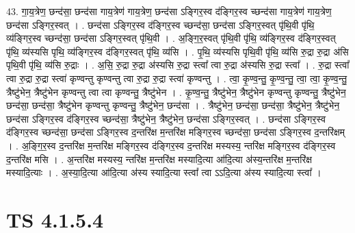 \documentclass[17pt]{extarticle}
\begin{document}
43. गा॒य॒त्रेण॒ छन्द॑सा॒ छन्द॑सा गाय॒त्रेण॑ गाय॒त्रेण॒ छन्द॑सा ऽङ्गिर॒स्व द॑ङ्गिर॒स्व च्छन्द॑सा गाय॒त्रेण॑ गाय॒त्रेण॒ छन्द॑सा ऽङ्गिर॒स्वत् । . छन्द॑सा ऽङ्गिर॒स्व द॑ङ्गिर॒स्व च्छन्द॑सा॒ छन्द॑सा ऽङ्गिर॒स्वत् पृ॑थि॒वी पृ॑थि॒ व्य॑ङ्गिर॒स्व च्छन्द॑सा॒ छन्द॑सा ऽङ्गिर॒स्वत् पृ॑थि॒वी । . अ॒ङ्गि॒र॒स्वत् पृ॑थि॒वी पृ॑थि॒ व्य॑ङ्गिर॒स्व द॑ङ्गिर॒स्वत् पृ॑थि॒ व्य॑स्यसि पृथि॒ व्य॑ङ्गिर॒स्व द॑ङ्गिर॒स्वत् पृ॑थि॒ व्य॑सि । . पृ॒थि॒ व्य॑स्यसि पृथि॒वी पृ॑थि॒ व्य॑सि रु॒द्रा रु॒द्रा अ॑सि पृथि॒वी पृ॑थि॒ व्य॑सि रु॒द्राः । . अ॒सि॒ रु॒द्रा रु॒द्रा अ॑स्यसि रु॒द्रा स्त्वा᳚ त्वा रु॒द्रा अ॑स्यसि रु॒द्रा स्त्वा᳚ । . रु॒द्रा स्त्वा᳚ त्वा रु॒द्रा रु॒द्रा स्त्वा॑ कृण्वन्तु कृण्वन्तु त्वा रु॒द्रा रु॒द्रा स्त्वा॑ कृण्वन्तु । . त्वा॒ कृ॒ण्व॒न्तु॒ कृ॒ण्व॒न्तु॒ त्वा॒ त्वा॒ कृ॒ण्व॒न्तु॒ त्रैष्टु॑भेन॒ त्रैष्टु॑भेन कृण्वन्तु त्वा त्वा कृण्वन्तु॒ त्रैष्टु॑भेन । . कृ॒ण्व॒न्तु॒ त्रैष्टु॑भेन॒ त्रैष्टु॑भेन कृण्वन्तु कृण्वन्तु॒ त्रैष्टु॑भेन॒ छन्द॑सा॒ छन्द॑सा॒ त्रैष्टु॑भेन कृण्वन्तु कृण्वन्तु॒ त्रैष्टु॑भेन॒ छन्द॑सा । . त्रैष्टु॑भेन॒ छन्द॑सा॒ छन्द॑सा॒ त्रैष्टु॑भेन॒ त्रैष्टु॑भेन॒ छन्द॑सा ऽङ्गिर॒स्व द॑ङ्गिर॒स्व च्छन्द॑सा॒ त्रैष्टु॑भेन॒ त्रैष्टु॑भेन॒ छन्द॑सा ऽङ्गिर॒स्वत् । . छन्द॑सा ऽङ्गिर॒स्व द॑ङ्गिर॒स्व च्छन्द॑सा॒ छन्द॑सा ऽङ्गिर॒स्व द॒न्तरि॑क्ष म॒न्तरि॑क्ष मङ्गिर॒स्व च्छन्द॑सा॒ छन्द॑सा ऽङ्गिर॒स्व द॒न्तरि॑क्षम् । . अ॒ङ्गि॒र॒स्व द॒न्तरि॑क्ष म॒न्तरि॑क्ष मङ्गिर॒स्व द॑ङ्गिर॒स्व द॒न्तरि॑क्ष मस्यस्य॒ न्तरि॑क्ष मङ्गिर॒स्व द॑ङ्गिर॒स्व द॒न्तरि॑क्ष मसि । . अ॒न्तरि॑क्ष मस्यस्य॒ न्तरि॑क्ष म॒न्तरि॑क्ष मस्यादि॒त्या आ॑दि॒त्या अ॑स्य॒न्तरि॑क्ष म॒न्तरि॑क्ष मस्यादि॒त्याः । . अ॒स्या॒दि॒त्या आ॑दि॒त्या अ॑स्य स्यादि॒त्या स्त्वा᳚ त्वा ऽऽदि॒त्या अ॑स्य स्यादि॒त्या स्त्वा᳚ । \newline
\pagebreak
{}

\section{ TS 4.1.5.4 }
\end{document}
